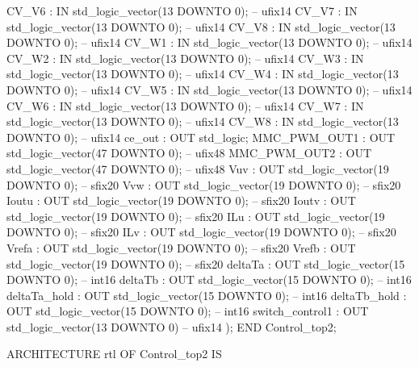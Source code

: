 \begin{mylisting}[language=VHDL,caption=MSSRDCDB制御\&SVPWMモジュール,label=appF_Control_top2_module_VHDL]
        CV_V6                             :   IN    std_logic_vector(13 DOWNTO 0);  -- ufix14
        CV_V7                             :   IN    std_logic_vector(13 DOWNTO 0);  -- ufix14
        CV_V8                             :   IN    std_logic_vector(13 DOWNTO 0);  -- ufix14
        CV_W1                             :   IN    std_logic_vector(13 DOWNTO 0);  -- ufix14
        CV_W2                             :   IN    std_logic_vector(13 DOWNTO 0);  -- ufix14
        CV_W3                             :   IN    std_logic_vector(13 DOWNTO 0);  -- ufix14
        CV_W4                             :   IN    std_logic_vector(13 DOWNTO 0);  -- ufix14
        CV_W5                             :   IN    std_logic_vector(13 DOWNTO 0);  -- ufix14
        CV_W6                             :   IN    std_logic_vector(13 DOWNTO 0);  -- ufix14
        CV_W7                             :   IN    std_logic_vector(13 DOWNTO 0);  -- ufix14
        CV_W8                             :   IN    std_logic_vector(13 DOWNTO 0);  -- ufix14
        ce_out                            :   OUT   std_logic;
        MMC_PWM_OUT1                      :   OUT   std_logic_vector(47 DOWNTO 0);  -- ufix48
        MMC_PWM_OUT2                      :   OUT   std_logic_vector(47 DOWNTO 0);  -- ufix48
        Vuv                               :   OUT   std_logic_vector(19 DOWNTO 0);  -- sfix20
        Vvw                               :   OUT   std_logic_vector(19 DOWNTO 0);  -- sfix20
        Ioutu                             :   OUT   std_logic_vector(19 DOWNTO 0);  -- sfix20
        Ioutv                             :   OUT   std_logic_vector(19 DOWNTO 0);  -- sfix20
        ILu                               :   OUT   std_logic_vector(19 DOWNTO 0);  -- sfix20
        ILv                               :   OUT   std_logic_vector(19 DOWNTO 0);  -- sfix20
        Vrefa                             :   OUT   std_logic_vector(19 DOWNTO 0);  -- sfix20
        Vrefb                             :   OUT   std_logic_vector(19 DOWNTO 0);  -- sfix20
        deltaTa                           :   OUT   std_logic_vector(15 DOWNTO 0);  -- int16
        deltaTb                           :   OUT   std_logic_vector(15 DOWNTO 0);  -- int16
        deltaTa_hold                      :   OUT   std_logic_vector(15 DOWNTO 0);  -- int16
        deltaTb_hold                      :   OUT   std_logic_vector(15 DOWNTO 0);  -- int16
        switch_control1                   :   OUT   std_logic_vector(13 DOWNTO 0)  -- ufix14
        );
END Control_top2;


ARCHITECTURE rtl OF Control_top2 IS


\end{mylisting}
